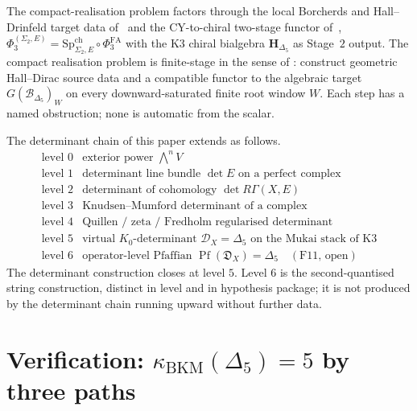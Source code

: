 \documentclass[11pt]{memoir}
\providecommand{\Pf}{\operatorname{Pf}}
\providecommand{\BKM}{\operatorname{BKM}}
\providecommand{\cD}{\mathcal{D}}
\begin{document}
\begin{remark}
\label{rem:vd-heal-path}
The compact-realisation problem factors through the local Borcherds
and Hall--Drinfeld target data of~\cite{LorgatIgusa} and the
CY-to-chiral two-stage functor of~\cite{LorgatVol3},
$\Phi_3^{(\Sigma_2, E)} = \mathrm{Sp}^{\mathrm{ch}}_{\Sigma_2, E}
\circ \Phi_3^{\mathrm{FA}}$ with the K3 chiral bialgebra
$\mathbf H_{\Delta_5}$ as Stage~$2$ output. The compact realisation
problem is finite-stage in the sense of
\cite[\S Compact realization]{LorgatIgusa}: construct geometric
Hall--Dirac source data and a compatible functor to the algebraic
target $G(\mathscr B_{\Delta_5})_W$ on every downward-saturated
finite root window $W$. Each step has a named obstruction;
none is automatic from the scalar.
\end{remark}

\begin{remark}
\label{rem:vd-diagnostic}
The determinant chain of this paper extends as follows.
\[
\begin{array}{rl}
  \text{level } 0 & \text{exterior power } \bigwedge^n V \\
  \text{level } 1 & \text{determinant line bundle } \det E
                    \text{ on a perfect complex} \\
  \text{level } 2 & \text{determinant of cohomology }
                    \det R\Gamma(X, E) \\
  \text{level } 3 & \text{Knudsen--Mumford determinant of a complex} \\
  \text{level } 4 & \text{Quillen / zeta / Fredholm regularised
                    determinant} \\
  \text{level } 5 & \text{virtual $K_0$-determinant }
                    \cD_X = \Delta_5
                    \text{ on the Mukai stack of K3} \\
  \text{level } 6 & \text{operator-level Pfaffian }
                    \Pf(\mathfrak D_X) = \Delta_5
                    \quad (\text{F11, open})
\end{array}
\]
The determinant construction closes at level $5$. Level $6$
is the second-quantised string construction, distinct in level and in
hypothesis package; it is not produced by the determinant chain
running upward without further data.
\end{remark}

\section{Verification: $\kappa_{\BKM}(\Delta_5) = 5$ by three paths}
\label{sec:vd-three-path}
\end{document}
